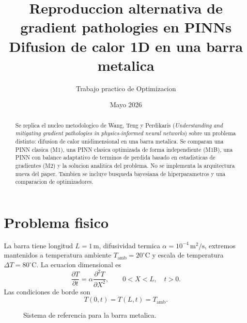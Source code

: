 \documentclass[11pt,a4paper]{article}
\title{Reproduccion alternativa de gradient pathologies en PINNs\\
\large Difusion de calor 1D en una barra metalica}
\author{Trabajo practico de Optimizacion}
\date{Mayo 2026}
\begin{document}
\maketitle

\begin{abstract}
Se replica el nucleo metodologico de Wang, Teng y Perdikaris
(\emph{Understanding and mitigating gradient pathologies in physics-informed
neural networks}) sobre un problema distinto: difusion de calor unidimensional
en una barra metalica. Se comparan una PINN clasica (M1), una PINN clasica
optimizada de forma independiente (M1B), una PINN con balance adaptativo de
terminos de perdida basado en estadisticas de gradientes (M2) y la solucion
analitica del problema. No se implementa la arquitectura nueva del paper.
Tambien se incluye busqueda bayesiana de hiperparametros y una comparacion de
optimizadores.
\end{abstract}

\section{Problema fisico}

La barra tiene longitud $L=1\,\mathrm{m}$, difusividad termica
$\alpha=10^{-4}\,\mathrm{m^2/s}$, extremos mantenidos a temperatura ambiente
$T_{\mathrm{amb}}=20^\circ\mathrm{C}$ y escala de temperatura
$\Delta T=80^\circ\mathrm{C}$. La ecuacion dimensional es
\begin{equation}
  \frac{\partial T}{\partial t}
  = \alpha \frac{\partial^2 T}{\partial X^2},
  \qquad 0<X<L,\quad t>0.
\end{equation}
Las condiciones de borde son
\begin{equation}
  T(0,t)=T(L,t)=T_{\mathrm{amb}}.
\end{equation}

\begin{figure}[H]
\centering
{}
\caption{Sistema de referencia para la barra metalica.}
\end{figure}
\end{document}
